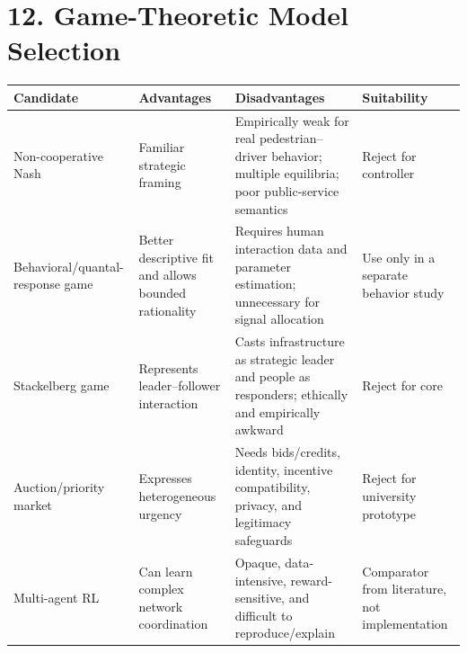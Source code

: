 \documentclass[
  english,
  11pt,
  a4paper,
]{article}
\newcounter{none} %
\begin{document}
\section{12. Game-Theoretic Model
Selection}\label{game-theoretic-model-selection}

{\def\LTcaptype{none} %
\begin{longtable}[]{@{}
  >{\raggedright\arraybackslash}p{}
  >{\raggedright\arraybackslash}p{}
  >{\raggedright\arraybackslash}p{}
  >{\raggedright\arraybackslash}p{}@{}}
\toprule\noalign{}
\begin{minipage}[b]{\linewidth}\raggedright
Candidate
\end{minipage} & \begin{minipage}[b]{\linewidth}\raggedright
Advantages
\end{minipage} & \begin{minipage}[b]{\linewidth}\raggedright
Disadvantages
\end{minipage} & \begin{minipage}[b]{\linewidth}\raggedright
Suitability
\end{minipage} \\
\midrule\noalign{}
\endhead
\bottomrule\noalign{}
\endlastfoot
Non-cooperative Nash & Familiar strategic framing & Empirically weak for
real pedestrian--driver behavior; multiple equilibria; poor
public-service semantics & Reject for controller \\
Behavioral/quantal-response game & Better descriptive fit and allows
bounded rationality & Requires human interaction data and parameter
estimation; unnecessary for signal allocation & Use only in a separate
behavior study \\
Stackelberg game & Represents leader--follower interaction & Casts
infrastructure as strategic leader and people as responders; ethically
and empirically awkward & Reject for core \\
Auction/priority market & Expresses heterogeneous urgency & Needs
bids/credits, identity, incentive compatibility, privacy, and legitimacy
safeguards & Reject for university prototype \\
Multi-agent RL & Can learn complex network coordination & Opaque,
data-intensive, reward-sensitive, and difficult to reproduce/explain &
Comparator from literature, not implementation \\

\end{longtable}}
\end{document}
